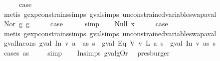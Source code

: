 \begin{isabellebody}
\ \ \isamarkupfalse%
\ \isamarkupfalse%
\ {\isacharquery}case\isanewline
\ \ \ \ \isamarkupfalse%
\ {\isacharparenleft}metis\ gexp{\isacharunderscore}constrains{\isachardot}simps{\isacharparenleft}{}{\isacharparenright}\ gval{\isachardot}simps{\isacharparenleft}{}{\isacharparenright}\ unconstrained{\isacharunderscore}variable{\isacharunderscore}swap{\isacharunderscore}aval{\isacharparenright}\isanewline
{}\isamarkupfalse%
\isanewline
\ \ \isamarkupfalse%
\ {\isacharparenleft}Nor\ g{}\ g{}{\isacharparenright}\isanewline
\ \ \isamarkupfalse%
\ \isamarkupfalse%
\ {\isacharquery}case\isanewline
\ \ \ \ \isamarkupfalse%
\ simp\isanewline
{}\isamarkupfalse%
\isanewline
\ \ \isamarkupfalse%
\ {\isacharparenleft}Null\ x{\isacharparenright}\isanewline
\ \ \isamarkupfalse%
\ \isamarkupfalse%
\ {\isacharquery}case\isanewline
\ \ \ \ \isamarkupfalse%
\ {\isacharparenleft}metis\ gexp{\isacharunderscore}constrains{\isachardot}simps{\isacharparenleft}{}{\isacharparenright}\ gval{\isachardot}simps{\isacharparenleft}{}{\isacharparenright}\ unconstrained{\isacharunderscore}variable{\isacharunderscore}swap{\isacharunderscore}aval{\isacharparenright}\isanewline
{}\isamarkupfalse%
%
\endisatagproof
{\isafoldproof}%
%
\isadelimproof
\isanewline
%
\endisadelimproof
\isanewline
{}\isamarkupfalse%
\ gval{\isacharunderscore}In{\isacharunderscore}cons{\isacharcolon}\ {\isachardoublequoteopen}gval\ {\isacharparenleft}In\ v\ {\isacharparenleft}a\ {\isacharhash}\ as{\isacharparenright}{\isacharparenright}\ s\ {\isacharequal}\ {\isacharparenleft}gval\ {\isacharparenleft}Eq\ {\isacharparenleft}V\ v{\isacharparenright}\ {\isacharparenleft}L\ a{\isacharparenright}{\isacharparenright}\ s\ {\isasymor}\isactrlsub {\isacharquery}\ gval\ {\isacharparenleft}In\ v\ as{\isacharparenright}\ s{\isacharparenright}{\isachardoublequoteclose}\isanewline
%
\isadelimproof
\ \ %
\endisadelimproof
%
\isatagproof
{}\isamarkupfalse%
\ {\isacharparenleft}cases\ as{\isacharparenright}\isanewline
\ \ \ \isamarkupfalse%
\ simp\isanewline
\ \ \isamarkupfalse%
\ In{\isachardot}simps{\isacharparenleft}{}{\isacharparenright}\ gval{\isacharunderscore}gOr\ \isamarkupfalse%
\ presburger%
\endisatagproof
{\isafoldproof}%
%
\isadelimproof

\end{isabellebody}
